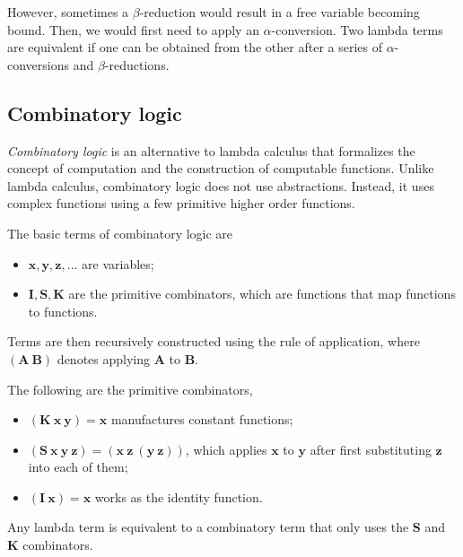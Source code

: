 However, sometimes a $\beta$-reduction would result in a free variable becoming
bound. Then, we would first need to apply an $\alpha$-conversion. Two lambda
terms are equivalent if one can be obtained from the other after a series of
$\alpha$-conversions and $\beta$-reductions.

\subsection{Combinatory logic}

\textit{Combinatory logic} \citep{curry1958combinatory} is an alternative to
lambda calculus that formalizes the concept of computation and the construction
of computable functions. Unlike lambda calculus, combinatory logic does not use
abstractions. Instead, it uses complex functions using a few primitive higher
order functions.

The basic terms of combinatory logic are
\begin{itemize}
    \item $\bm{x},\bm{y},\bm{z},\ldots$ are variables;
    \item $\mathbf{I},\mathbf{S},\mathbf{K}$ are the primitive combinators, which
          are functions that map functions to functions.
\end{itemize}

Terms are then recursively constructed using the rule of application, where
$(\mathbf{A} \: \mathbf{B})$ denotes applying $\mathbf{A}$ to $\mathbf{B}$.

The following are the primitive combinators,
\begin{itemize}
    \item $(\mathbf{K} \: \bm{x} \: \bm{y}) = \bm{x}$ manufactures constant functions;
    \item $(\mathbf{S} \: \bm{x} \: \bm{y} \: \bm{z}) = (\bm{x} \: \bm{z} \:
              (\bm{y} \: \bm{z}))$, which applies $\bm{x}$ to $\bm{y}$ after first substituting
          $\bm{z}$ into each of them;
    \item $(\mathbf{I} \: \bm{x}) = \bm{x}$ works as the identity
          function.
\end{itemize}
Any lambda term is equivalent to a combinatory term that only uses the
$\mathbf{S}$ and $\mathbf{K}$ combinators.

